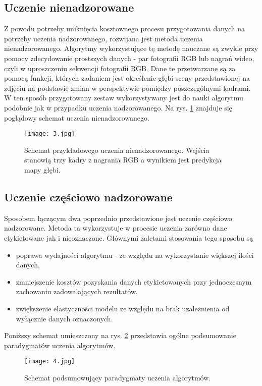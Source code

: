 \subsection{Uczenie nienadzorowane}
Z powodu potrzeby uniknięcia kosztownego procesu przygotowania danych na potrzeby uczenia nadzorowanego, rozwijana jest metoda uczenia nienadzorowanego. Algorytmy wykorzystujące tę metodę nauczane są zwykle przy pomocy zdecydowanie prostszych danych - par fotografii RGB lub nagrań wideo, czyli w uproszczeniu sekwencji fotografii RGB. Dane te przetwarzane są za pomocą funkcji, których zadaniem jest określenie głębi sceny przedstawionej na zdjęciu na podstawie zmian w perspektywie pomiędzy poszczególnymi kadrami. W ten sposób przygotowany zestaw wykorzystywany jest do nauki algorytmu podobnie jak w przypadku uczenia nadzorowanego. Na rys. \ref{fig:uczenie-nienadzorowane} znajduje się poglądowy schemat uczenia nienadzorowanego.
\begin{figure}[H]
    \centering
    \texttt{[image: 3.jpg]}
    \caption{Schemat przykładowego uczenia nienadzorowanego. Wejścia stanowią trzy kadry z nagrania RGB a wynikiem jest predykcja mapy głębi.}
    \label{fig:uczenie-nienadzorowane}
\end{figure}

\subsection{Uczenie częściowo nadzorowane}
Sposobem łączącym dwa poprzednio przedstawione jest uczenie częściowo nadzorowane. Metoda ta wykorzystuje w procesie uczenia zarówno dane etykietowane jak i nieoznaczone. Głównymi zaletami stosowania tego sposobu są
\begin{itemize}
\item poprawa wydajności algorytmu - ze względu na wykorzystanie większej ilości danych,
\item zmniejszenie kosztów pozyskania danych etykietowanych przy jednoczesnym zachowaniu zadowalających rezultatów,
\item zwiększenie elastyczności modelu ze względu na brak uzależnienia od wyłącznie danych oznaczonych.
\end{itemize}

\vspace{1cm}
Poniższy schemat umieszczony na rys. \ref{fig:podsumowanie-uczenia} przedstawia ogólne podsumowanie paradygmatów uczenia algorytmów.
\begin{figure}[H]
    \centering
    \texttt{[image: 4.jpg]}
    \caption{Schemat podsumowujący paradygmaty uczenia algorytmów.}
    \label{fig:podsumowanie-uczenia}
\end{figure}


